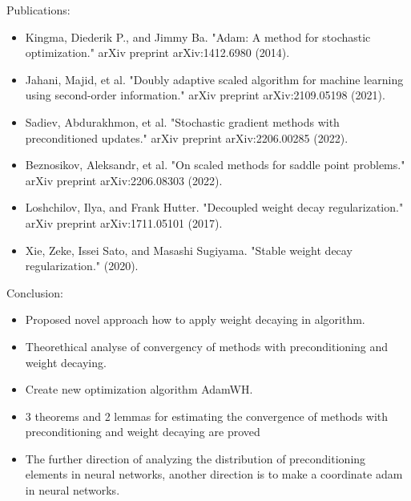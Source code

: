 \documentclass[aspectratio=169, 12pt]{beamer}
\begin{document}
\begin{frame}{Publications:}
    \begin{itemize}
        \item Kingma, Diederik P., and Jimmy Ba. "Adam: A method for stochastic optimization." arXiv preprint arXiv:1412.6980 (2014).
        \item Jahani, Majid, et al. "Doubly adaptive scaled algorithm for machine learning using second-order information." arXiv preprint arXiv:2109.05198 (2021).
        \item Sadiev, Abdurakhmon, et al. "Stochastic gradient methods with preconditioned updates." arXiv preprint arXiv:2206.00285 (2022).
        \item Beznosikov, Aleksandr, et al. "On scaled methods for saddle point problems." arXiv preprint arXiv:2206.08303 (2022).
        \item Loshchilov, Ilya, and Frank Hutter. "Decoupled weight decay regularization." arXiv preprint arXiv:1711.05101 (2017).
        \item Xie, Zeke, Issei Sato, and Masashi Sugiyama. "Stable weight decay regularization." (2020).
    \end{itemize}
\end{frame}

\begin{frame}{Conclusion:}
    \begin{itemize}
        \item Proposed novel approach how to apply weight decaying in algorithm.
        \item Theorethical analyse of convergency of methods with preconditioning and weight decaying. 
        \item Create new optimization algorithm AdamWH.
        \item 3 theorems and 2 lemmas for estimating the convergence of methods with preconditioning and weight decaying are proved 
        \item The further direction of analyzing the distribution of preconditioning elements in neural networks, another direction is to make a coordinate adam in neural networks.
    \end{itemize}
\end{frame}
\end{document}
